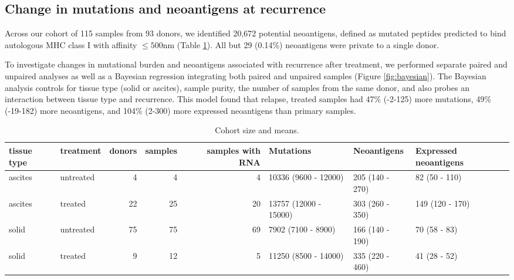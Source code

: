 \subsection{Change in mutations and neoantigens at recurrence}
Across our cohort of 115 samples from 93 donors, we identified 20,672 potential neoantigens, defined as mutated peptides predicted to bind autologous MHC class I with affinity $\leq 500$nm (Table \ref{tab:cohort}). All but 29 (0.14\%) neoantigens were private to a single donor.

To investigate changes in mutational burden and neoantigens associated with recurrence after treatment, we performed separate paired and unpaired analyses as well as a Bayesian regression integrating both paired and unpaired samples (Figure \ref{fig:bayesian}). The Bayesian analysis controls for tissue type (solid or ascites), sample purity, the number of samples from the same donor, and also probes an interaction between tissue type and recurrence. This model found that relapse, treated samples had 47\% (-2-125) more mutations, 49\% (-19-182) more neoantigens, and 104\% (2-300) more expressed neoantigens than primary samples.

\begin{table}
\begin{tabular}{llrrrlll}
\toprule
tissue type &  treatment &  donors &  samples &  samples with RNA &              Mutations &      Neoantigens & Expressed neoantigens \\
\midrule
    ascites &  untreated &       4 &        4 &                 4 &   10336 (9600 - 12000) &  205 (140 - 270) &         82 (50 - 110) \\
    ascites &    treated &      22 &       25 &                20 &  13757 (12000 - 15000) &  303 (260 - 350) &       149 (120 - 170) \\
      solid &  untreated &      75 &       75 &                69 &     7902 (7100 - 8900) &  166 (140 - 190) &          70 (58 - 83) \\
      solid &    treated &       9 &       12 &                 5 &   11250 (8500 - 14000) &  335 (220 - 460) &          41 (28 - 52) \\
\bottomrule
\end{tabular}
\caption{Cohort size and means.}
\label{tab:cohort}
\end{table}


